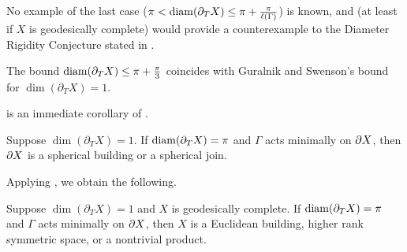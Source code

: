 \documentclass{amsart}
\newcommand{\bdT}{\partial_T}
\DeclareMathOperator{\CAT}{CAT}
\begin{document}

\begin{remark}
No example of the last case ($\pi < \diam (\bdT X) \le \pi + \frac{\pi}{\ell(\Gamma)}$) is known, and (at least if $X$ is geodesically complete) would provide a counterexample to the Diameter Rigidity Conjecture stated in \cite{bb}.
\end{remark}

\begin{remark}
The bound $\diam (\bdT X) \le \pi + \frac{\pi}{3}$ coincides with Guralnik and Swenson's bound \cite{gs} for $\dim (\bdT X) = 1$.
\end{remark}

 is an immediate corollary of .

\begin{theorem}[\thmref{MC1}]	\label{dimension 1, diameter pi, boundary statement}
Suppose $\dim(\bdT X) = 1$.  If $\diam (\bdT X) = \pi$ and $\Gamma$ acts minimally on $\partial X$, then $\partial X$ is a spherical building or a spherical join. \end{theorem}

Applying , we obtain the following.

\begin{corollary}[\corref{MC2}]	\label{dimension 1, diameter pi, geodesically complete}
Suppose $\dim(\bdT X) = 1$ and $X$ is geodesically complete.  If $\diam (\bdT X) = \pi$ and $\Gamma$ acts minimally on $\partial X$, then $X$ is a Euclidean building, higher rank symmetric space, or a nontrivial product. \end{corollary}




\end{document}
